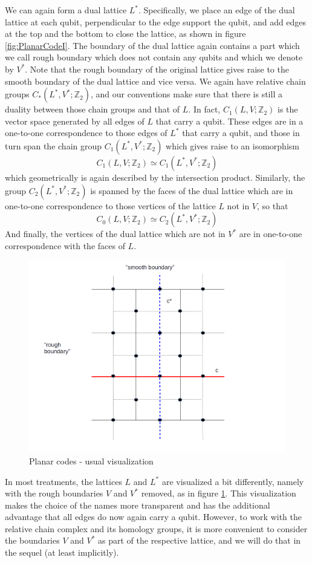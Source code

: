 \documentclass[a4paper, draft]{article}
\theoremstyle{own}
\theoremstyle{remark}
\newcommand{\Z}{\mathbb{Z}}
\begin{document}
We can again form a dual lattice $L^*$. Specifically, we place an edge of the dual lattice at each qubit, perpendicular to the edge support the qubit, and add edges at the top and the bottom to close the lattice, as shown in figure \ref{fig:PlanarCodeI}. The boundary of the dual lattice again contains a part which we call rough boundary which does not contain any qubits and which we denote by $V^*$. Note that the rough boundary of the original lattice gives raise to the smooth boundary of the dual lattice and vice versa. We again have relative chain groups $C_*(L^*,V^*;\Z_2)$, and our conventions make sure that there is still a duality between those chain groups and that of $L$. In fact, $C_1(L,V;\Z_2)$ is the vector space generated by all edges of $L$ that carry a qubit. These edges are in a one-to-one correspondence to those edges of $L^*$ that carry a qubit, and those in turn span the chain group $C_1(L^*,V^*;\Z_2)$ which gives raise to an isomorphism
$$
C_1(L,V;\Z_2) \simeq C_1(L^*,V^*;\Z_2)
$$
which geometrically is again described by the intersection product. Similarly, the group $C_2(L^*,V^*;\Z_2)$ is spanned by the faces of the dual lattice which are in one-to-one correspondence to those vertices of the lattice $L$ not in $V$, so that
$$
C_0(L,V;\Z_2) \simeq C_2(L^*,V^*;\Z_2)
$$
And finally, the vertices of the dual lattice which are not in $V^*$ are in one-to-one correspondence with the faces of $L$.



\begin{figure}[ht]
\centering
\includegraphics[width=0.7\linewidth]{images/PlanarCodeII}
\caption[Planar codes - usual visualization]{Planar codes - usual visualization}
\label{fig:PlanarCodeII}
\end{figure}


In most treatments, the lattices $L$ and $L^*$ are visualized a bit differently, namely with the rough boundaries $V$ and $V^*$ removed, as in figure \ref{fig:PlanarCodeII}. This visualization makes the choice of the names more transparent and has the additional advantage that all edges do now again carry a qubit. However, to work with the relative chain complex and its homology groups, it is more convenient to consider the boundaries $V$ and $V^*$ as part of the respective lattice, and we will do that in the sequel (at least implicitly). 
\end{document}
